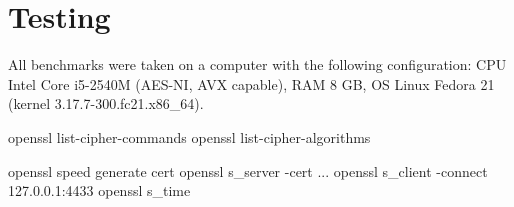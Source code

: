 \section{Testing}


All benchmarks were taken on a computer with the following configuration: CPU Intel Core i5-2540M (AES-NI, AVX capable), RAM 8 GB, OS Linux Fedora 21 (kernel 3.17.7-300.fc21.x86\_64).

openssl list-cipher-commands
openssl list-cipher-algorithms

openssl speed
generate cert
openssl s\_server -cert ...
openssl s\_client -connect 127.0.0.1:4433
openssl s\_time
